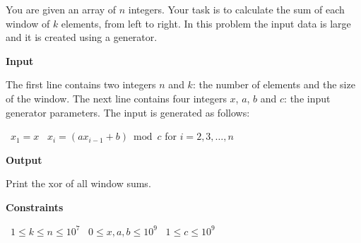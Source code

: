 You are given an array of $n$ integers. Your task is to calculate the sum of each window of $k$ elements, from left to right.
In this problem the input data is large and it is created using a generator.

\vspace{0.3cm}\noindent\textbf{Input}

The first line contains two integers $n$ and $k$: the number of elements and the size of the window.
The next line contains four integers $x$, $a$, $b$ and $c$: the input generator parameters. The input is generated as follows:

\textbullet\ $x_1=x$
\textbullet\ $x_i=(ax_{i-1}+b) \bmod c$ for $i=2,3,\dots,n$

\vspace{0.3cm}\noindent\textbf{Output}

Print the xor of all window sums.

\vspace{0.3cm}\noindent\textbf{Constraints}

\textbullet\ $1 \le k \le n \le 10^7$
\textbullet\ $0 \le x, a, b \le 10^9$
\textbullet\ $1 \le c \le 10^9$